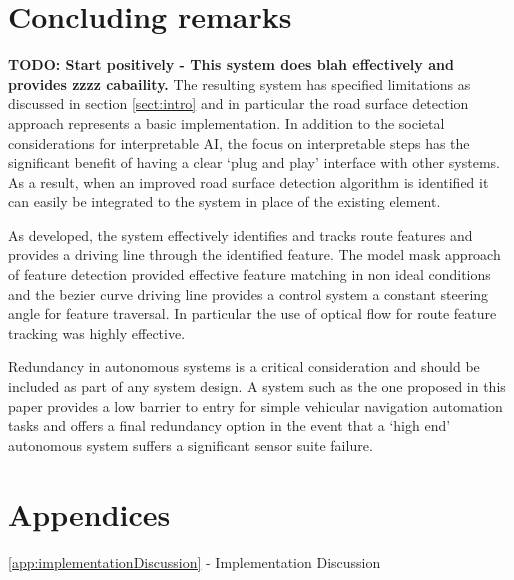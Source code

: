 \documentclass[]{aiaa-tc}%
\begin{document}
\section{Concluding remarks}

\textbf{TODO: Start positively - This system does blah effectively and provides zzzz cabaility. }The resulting system has specified limitations as discussed in section \ref{sect:intro} and in particular the road surface detection approach represents a basic implementation. In addition to the societal considerations for interpretable AI, the focus on interpretable steps has the significant benefit of having a clear `plug and play' interface with other systems. As a result, when an improved road surface detection algorithm is identified it can easily be integrated to the system in place of the existing element. 

As developed, the system effectively identifies and tracks route features and provides a driving line through the identified feature. The model mask approach of feature detection provided effective feature matching in non ideal conditions and the bezier curve driving line provides a control system a constant steering angle for feature traversal. In particular the use of optical flow for route feature tracking was highly effective. 

Redundancy in autonomous systems is a critical consideration and should be included as part of any system design. A system such as the one proposed in this paper provides a low barrier to entry for simple vehicular navigation automation tasks and offers a final redundancy option in the event that a `high end' autonomous system suffers a significant sensor suite failure.


\section*{Appendices}
\ref{app:implementationDiscussion} - Implementation Discussion \\

\newpage
\end{document}
